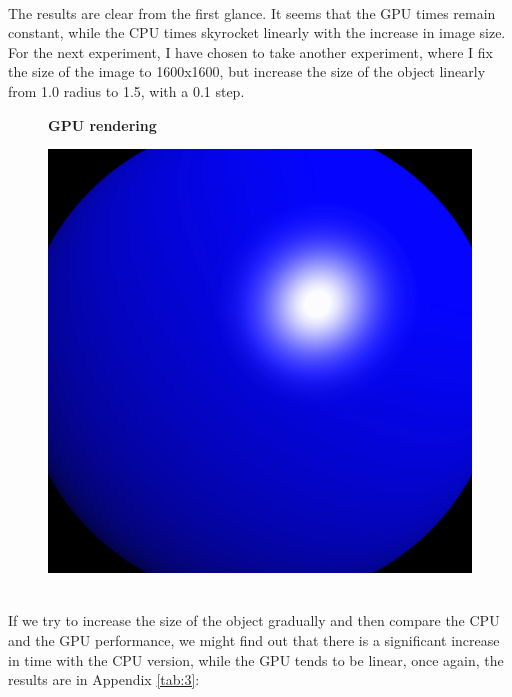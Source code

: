 \documentclass[english]{exam}
\begin{document}
\ \\
\noindent
The results are clear from the first glance. It seems that the GPU times remain constant, while the CPU times skyrocket linearly with the increase in image size. For the next experiment, I have chosen to take another experiment, where I fix the size of the image to 1600x1600, but increase the size of the object linearly from 1.0 radius to 1.5, with a 0.1 step.
\begin{figure}[H]
    \centering
    \textbf{GPU rendering}\par\medskip
    \includegraphics[scale=0.4]{gpu2.png}
    \caption{}
\end{figure}

\ \\
\noindent
If we try to increase the size of the object gradually and then compare the CPU and the GPU performance, we might find out that there is a significant increase in time with the CPU version, while the GPU tends to be linear, once again, the results are in Appendix \ref{tab:3}:
\end{document}
